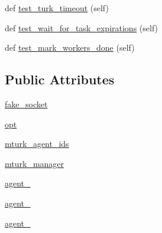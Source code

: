 \begin{DoxyCompactItemize}
\item 
def \hyperlink{classparlai_1_1mturk_1_1core_1_1legacy__2018_1_1test_1_1test__mturk__manager_1_1TestMTurkManagerUnitFunctions_a60dd7f7430c35cc31c82cc8773939d03}{test\+\_\+turk\+\_\+timeout} (self)
\item 
def \hyperlink{classparlai_1_1mturk_1_1core_1_1legacy__2018_1_1test_1_1test__mturk__manager_1_1TestMTurkManagerUnitFunctions_a36a64514bc98c443578e55ab0b01a8b9}{test\+\_\+wait\+\_\+for\+\_\+task\+\_\+expirations} (self)
\item 
def \hyperlink{classparlai_1_1mturk_1_1core_1_1legacy__2018_1_1test_1_1test__mturk__manager_1_1TestMTurkManagerUnitFunctions_ae3cac1da2b18fda9e1e06482a592d430}{test\+\_\+mark\+\_\+workers\+\_\+done} (self)
\end{DoxyCompactItemize}
\subsection*{Public Attributes}
\begin{DoxyCompactItemize}
\item 
\hyperlink{classparlai_1_1mturk_1_1core_1_1legacy__2018_1_1test_1_1test__mturk__manager_1_1TestMTurkManagerUnitFunctions_add322d6b34261b094728b50a1c256ee0}{fake\+\_\+socket}
\item 
\hyperlink{classparlai_1_1mturk_1_1core_1_1legacy__2018_1_1test_1_1test__mturk__manager_1_1TestMTurkManagerUnitFunctions_ae7e67ea04b31ae41cb9fc1cc72da1828}{opt}
\item 
\hyperlink{classparlai_1_1mturk_1_1core_1_1legacy__2018_1_1test_1_1test__mturk__manager_1_1TestMTurkManagerUnitFunctions_ad9661364287d6af97abe3a1ec2bdc4a4}{mturk\+\_\+agent\+\_\+ids}
\item 
\hyperlink{classparlai_1_1mturk_1_1core_1_1legacy__2018_1_1test_1_1test__mturk__manager_1_1TestMTurkManagerUnitFunctions_a3c165c9fff28bf472b228a23c9882f84}{mturk\+\_\+manager}
\item 
\hyperlink{classparlai_1_1mturk_1_1core_1_1legacy__2018_1_1test_1_1test__mturk__manager_1_1TestMTurkManagerUnitFunctions_a8f45e53155bc920a4282fcb3ca565ef4}{agent\+\_}
\item 
\hyperlink{classparlai_1_1mturk_1_1core_1_1legacy__2018_1_1test_1_1test__mturk__manager_1_1TestMTurkManagerUnitFunctions_ac36ba0b784d63c6ed9e11aa3265e267d}{agent\+\_}
\item 
\hyperlink{classparlai_1_1mturk_1_1core_1_1legacy__2018_1_1test_1_1test__mturk__manager_1_1TestMTurkManagerUnitFunctions_a2a3bbe3cc2b07805c50aced8ff56dcfe}{agent\+\_}
\end{DoxyCompactItemize}


